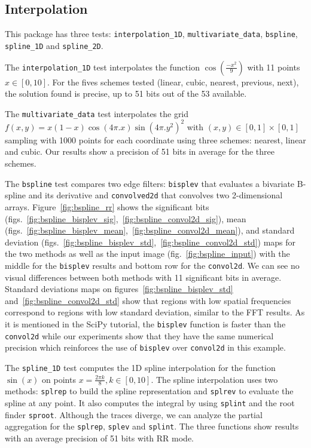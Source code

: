 \documentclass[11pt]{article}
\begin{document}
\subsection{Interpolation}

This package has three tests: \texttt{interpolation\_1D}, \texttt{multivariate\_data}, \texttt{bspline}, \texttt{spline\_1D} and \texttt{spline\_2D}.

The \texttt{interpolation\_1D} test interpolates the function $\cos(\frac{-x^2}{9})$ with 11 points $x\in[0,10]$.
For the fives schemes tested (linear, cubic, nearest, previous, next), the solution found is precise, up to 51 bits out of the 53 available.

The \texttt{multivariate\_data} test interpolates the grid $f(x,y)=x(1-x)\cos(4\pi.x)  \sin(4\pi.y^2)^2$ with $(x,y) \in [0,1] \times [0,1]$ sampling with 1000 points for each coordinate using three schemes: nearest, linear and cubic. Our results show a precision of 51 bits in average for the three schemes. 

The \texttt{bspline} test compares two edge filters: \texttt{bisplev} that evaluates a bivariate B-spline and its derivative and \texttt{convolved2d} that convolves two 2-dimensional arrays. Figure~\ref{fig:bspline_rr}
shows the significant bits (figs.~\ref{fig:bspline_bisplev_sig},~\ref{fig:bspline_convol2d_sig}), 
mean (figs.~\ref{fig:bspline_bisplev_mean},~\ref{fig:bspline_convol2d_mean}), and standard deviation (figs.~\ref{fig:bspline_bisplev_std},~\ref{fig:bspline_convol2d_std}) maps for the two methods as well as the input image (fig.~\ref{fig:bspline_input}) with the middle for the \texttt{bisplev} results and bottom row for the \texttt{convol2d}. We can see no visual differences between both methods with 11 significant bits in average. Standard deviations maps on figures~\ref{fig:bspline_bisplev_std} and~\ref{fig:bspline_convol2d_std} show that regions with low spatial frequencies correspond to regions with low standard deviation, similar to the FFT results. As it is mentioned in the SciPy tutorial, the \texttt{bisplev} function is faster than the \texttt{convol2d} while our experiments show that they have the same numerical precision which reinforces the use of \texttt{bisplev} over \texttt{convol2d} in this example.

The \texttt{spline\_1D} test computes the 1D spline interpolation for the function $\sin(x)$ on points $x=\frac{2\pi k}{8}, k \in [0, 10]$. The spline interpolation uses two methods: \texttt{splrep} to build the spline representation and \texttt{splrev} to evaluate the spline at any point. It also computes the integral by using \texttt{splint} and the root finder \texttt{sproot}. Although the traces diverge, we can analyze the partial aggregation for the \texttt{splrep}, \texttt{splev} and \texttt{splint}. The three functions show results with an average precision of 51 bits with RR mode.
 
\end{document}
